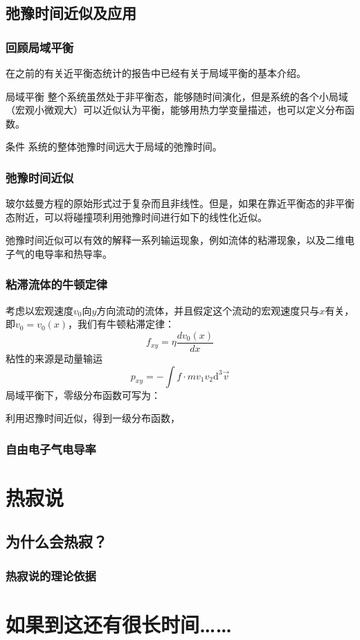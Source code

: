 \documentclass{if-beamer}
\begin{document}
\subsection{弛豫时间近似及应用}
\begin{frame}
    \frametitle{回顾局域平衡}
    在之前的有关近平衡态统计的报告中已经有关于局域平衡的基本介绍。
    \begin{block}
        {局域平衡}
        整个系统虽然处于非平衡态，能够随时间演化，但是系统的各个小局域（宏观小微观大）可以近似认为平衡，能够用热力学变量描述，也可以定义分布函数。
    \end{block}
    \begin{block}
        {条件}
        系统的整体弛豫时间远大于局域的弛豫时间。
    \end{block}
    
\end{frame}
\begin{frame}
    \frametitle{弛豫时间近似}
        玻尔兹曼方程的原始形式过于复杂而且非线性。但是，如果在靠近平衡态的非平衡态附近，可以将碰撞项利用弛豫时间进行如下的线性化近似。
    
        弛豫时间近似可以有效的解释一系列输运现象，例如流体的粘滞现象，以及二维电子气的电导率和热导率。
\end{frame}
\begin{frame}
    \frametitle{粘滞流体的牛顿定律}
        考虑以宏观速度$v_0$向$y$方向流动的流体，并且假定这个流动的宏观速度只与$x$有关，即$v_0=v_0(x)$，我们有牛顿粘滞定律：
        \begin{equation*}
            f_{xy}=\eta\frac{dv_0(x)}{dx}
        \end{equation*}
        粘性的来源是动量输运
        \begin{equation*}
            p_{xy}=-\int{f\cdot mv_1v_2\mathrm{d}^3\vec{v}}
        \end{equation*}
        局域平衡下，零级分布函数可写为：

        利用迟豫时间近似，得到一级分布函数，

\end{frame}
\begin{frame}
    \frametitle{自由电子气电导率}
    
\end{frame}
\section{热寂说}
\subsection{为什么会热寂？}
\begin{frame}
    \frametitle{热寂说的理论依据}

    

\end{frame}

\section{如果到这还有很长时间……}
\end{document}
